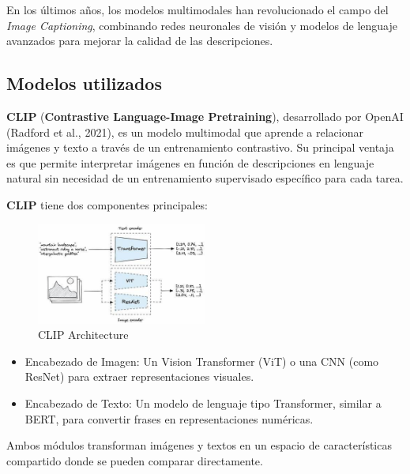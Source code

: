 \documentclass[14pt]{extarticle}
\begin{document}
En los últimos años, los modelos multimodales han revolucionado el campo del \textit{Image Captioning}, combinando redes neuronales de visión y modelos de lenguaje avanzados para mejorar la calidad de las descripciones.

\subsection{Modelos utilizados}

\textbf{CLIP} (\textbf{Contrastive Language-Image Pretraining}), desarrollado por OpenAI (Radford et al., 2021), es un modelo multimodal que aprende a relacionar imágenes y texto a través de un entrenamiento contrastivo. Su principal ventaja es que permite interpretar imágenes en función de descripciones en lenguaje natural sin necesidad de un entrenamiento supervisado específico para cada tarea.

\textbf{CLIP} tiene dos componentes principales:

\begin{figure}[h]
    \centering
    \includegraphics[width=0.5\textwidth]{./images/OIP.jpg}
    \caption{CLIP Architecture}
    \label{fig:clip}
\end{figure}

\begin{itemize}
    \item Encabezado de Imagen: Un Vision Transformer (ViT) o una CNN (como ResNet) para extraer representaciones visuales.
    \item Encabezado de Texto: Un modelo de lenguaje tipo Transformer, similar a BERT, para convertir frases en representaciones numéricas.
\end{itemize}

Ambos módulos transforman imágenes y textos en un espacio de características compartido donde se pueden comparar directamente.
\end{document}
